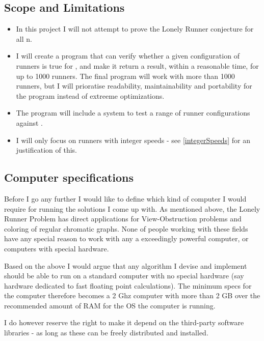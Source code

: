 \subsection{Scope and Limitations}
\begin{itemize}
\item In this project I will not attempt to prove the Lonely Runner conjecture for all n. 
\item I will create a program that can verify whether a given configuration of runners is true for , and make it return a result, within a reasonable time, for up to 1000 runners. The final program will work with more than 1000 runners, but I will prioratise readability, maintainability and portability for the program instead of extreeme optimizations. 
\item The program will include a system to test a range of runner configurations against .
\item I will only focus on runners with integer speeds - see \ref{integerSpeeds} for an justification of this.
\end{itemize}

\subsection{Computer specifications}
\label{specs}
Before I go any further I would like to define which kind of computer I would require for running the solutions I come up with. As mentioned above, the Lonely Runner Problem has direct applications for View-Obstruction problems and coloring of regular chromatic graphs. None of people working with these fields have any special reason to work with any a exceedingly powerful computer, or computers with special hardware.
 
Based on the above I would argue that any algorithm I devise and implement should be able to run on a standard computer with no special hardware (say hardware dedicated to fast floating point calculations). The minimum specs for the computer therefore becomes a 2 Ghz computer with more than 2 GB over the recommended amount of RAM for the OS the computer is running. 

I do however reserve the right to make it depend on the third-party software libraries - as long as these can be freely distributed and installed.

